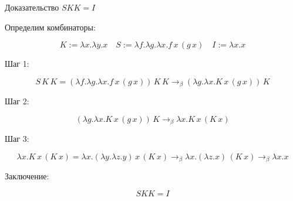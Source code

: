 \documentclass{article}
\begin{document}
Доказательство $S K K = I$

Определим комбинаторы:

\[K := \lambda x.\lambda y.x \quad
	S := \lambda f.\lambda g.\lambda x. f\,x\,(g\,x) \quad
	I := \lambda x.x\]

Шаг 1:

\[S\,K\,K = (\lambda f.\lambda g.\lambda x. f\,x\,(g\,x))\,K\,K\to_\beta
	(\lambda g.\lambda x. K\,x\,(g\,x))\,K\]

Шаг 2:

\[(\lambda g.\lambda x. K\,x\,(g\,x))\,K\to_\beta
	\lambda x. K\,x\,(K\,x)\]

Шаг 3:

\[\lambda x. K\,x\,(K\,x)
	= \lambda x. (\lambda y.\lambda z.y)\,x\,(K\,x)
	\to_\beta \lambda x. (\lambda z. x)\,(K\,x)
	\to_\beta \lambda x. x\]

Заключение:

\[S K K = I\]
\end{document}
